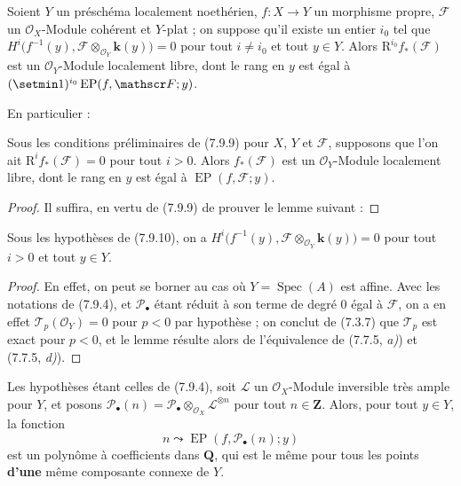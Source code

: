 \begin{corollary}[7.9.9]
\label{III.7.9.9.fr}
Soient $Y$ un préschéma localement noethérien, $f:X\to Y$ un morphisme propre,
$\mathscr F$ un $\mathscr O_X$-Module cohérent et $Y$-plat ; on suppose qu'il
existe un entier $i_0$ tel que
$H^i\bigl(f^{-1}(y),\mathscr F\otimes_{\mathscr O_Y}\boldsymbol{k}(y)\bigr)=0$ pour tout $i\ne i_0$ et tout $y\in Y$.
Alors $\mathrm R^{i_0}f_*(\mathscr F)$ est un $\mathscr O_Y$-Module localement
libre, dont le rang en $y$ est égal à
$(\setmin 1)^{i_0}\operatorname{EP}(f,\mathscr F;y)$.
\end{corollary}

En particulier :

\begin{corollary}[7.9.10]
\label{III.7.9.10.fr}
Sous les conditions préliminaires de \textup{(7.9.9)} pour $X$, $Y$ et $\mathscr F$,
supposons que l'on ait $\mathrm R^if_*(\mathscr F)=0$ pour tout $i>0$. Alors
$f_*(\mathscr F)$ est un $\mathscr O_Y$-Module localement libre, dont le rang en
$y$ est égal à $\operatorname{EP}(f,\mathscr F;y)$.
\end{corollary}

\begin{proof}
Il suffira, en vertu de (7.9.9) de prouver le lemme suivant :
\end{proof}

\begin{lemma}[7.9.10.1]
\label{III.7.9.10.1.fr}
Sous les hypothèses de \textup{(7.9.10)}, on a $H^i\bigl(f^{-1}(y),\mathscr F\otimes_{\mathscr O_Y}\boldsymbol{k}(y)\bigr)=0$
pour tout $i>0$ et tout $y\in Y$.
\end{lemma}

\begin{proof}
En effet, on peut se borner au cas où $Y=\operatorname{Spec}(A)$ est affine.
Avec les notations de (7.9.4), et $\mathscr P_\bullet$ étant réduit à son terme
de degré $0$ égal à $\mathscr F$, on a en effet
$\mathscr T_p(\mathscr O_Y)=0$ pour $p<0$ par hypothèse ; on conclut de (7.3.7)
que $\mathscr T_p$ est exact pour $p<0$, et le lemme résulte alors de
l'équivalence de (7.7.5, \emph{a)}) et (7.7.5, \emph{d)}).
\end{proof}

\begin{proposition}[7.9.11]
\label{III.7.9.11.fr}
Les hypothèses étant celles de \textup{(7.9.4)}, soit $\mathscr L$ un
$\mathscr O_X$-Module inversible très ample pour $Y$, et posons
$\mathscr P_\bullet(n)=\mathscr P_\bullet\otimes_{\mathscr O_X}
\mathscr L^{\otimes n}$ pour tout $n\in\mathbf Z$. Alors, pour tout $y\in Y$,
la fonction
\[
  n\leadsto\operatorname{EP}(f,\mathscr P_\bullet(n);y)
  \tag{7.9.11.1}\label{III.7.9.11.1.fr}
\]
est un polynôme à coefficients dans $\mathbf Q$, qui est le même pour tous les
points \textbf{d'une} même composante connexe de $Y$.
\end{proposition}


